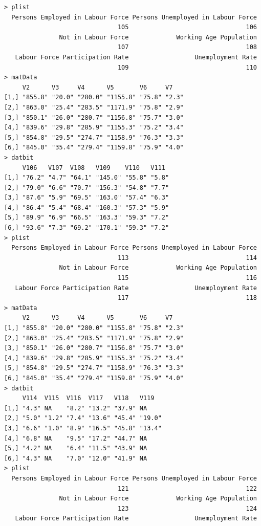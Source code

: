 \documentclass[a4paper]{article}
\begin{document}
\begin{verbatim}
> plist 
  Persons Employed in Labour Force Persons Unemployed in Labour Force 
                               105                                106 
               Not in Labour Force             Working Age Population 
                               107                                108 
   Labour Force Participation Rate                  Unemployment Rate 
                               109                                110 
> matData 
     V2      V3     V4      V5       V6     V7   
[1,] "855.8" "20.0" "280.0" "1155.8" "75.8" "2.3"
[2,] "863.0" "25.4" "283.5" "1171.9" "75.8" "2.9"
[3,] "850.1" "26.0" "280.7" "1156.8" "75.7" "3.0"
[4,] "839.6" "29.8" "285.9" "1155.3" "75.2" "3.4"
[5,] "854.8" "29.5" "274.7" "1158.9" "76.3" "3.3"
[6,] "845.0" "35.4" "279.4" "1159.8" "75.9" "4.0"
> datbit 
     V106   V107  V108   V109    V110   V111 
[1,] "76.2" "4.7" "64.1" "145.0" "55.8" "5.8"
[2,] "79.0" "6.6" "70.7" "156.3" "54.8" "7.7"
[3,] "87.6" "5.9" "69.5" "163.0" "57.4" "6.3"
[4,] "86.4" "5.4" "68.4" "160.3" "57.3" "5.9"
[5,] "89.9" "6.9" "66.5" "163.3" "59.3" "7.2"
[6,] "93.6" "7.3" "69.2" "170.1" "59.3" "7.2"
> plist 
  Persons Employed in Labour Force Persons Unemployed in Labour Force 
                               113                                114 
               Not in Labour Force             Working Age Population 
                               115                                116 
   Labour Force Participation Rate                  Unemployment Rate 
                               117                                118 
> matData 
     V2      V3     V4      V5       V6     V7   
[1,] "855.8" "20.0" "280.0" "1155.8" "75.8" "2.3"
[2,] "863.0" "25.4" "283.5" "1171.9" "75.8" "2.9"
[3,] "850.1" "26.0" "280.7" "1156.8" "75.7" "3.0"
[4,] "839.6" "29.8" "285.9" "1155.3" "75.2" "3.4"
[5,] "854.8" "29.5" "274.7" "1158.9" "76.3" "3.3"
[6,] "845.0" "35.4" "279.4" "1159.8" "75.9" "4.0"
> datbit 
     V114  V115  V116  V117   V118   V119  
[1,] "4.3" NA    "8.2" "13.2" "37.9" NA    
[2,] "5.0" "1.2" "7.4" "13.6" "45.4" "19.0"
[3,] "6.6" "1.0" "8.9" "16.5" "45.8" "13.4"
[4,] "6.8" NA    "9.5" "17.2" "44.7" NA    
[5,] "4.2" NA    "6.4" "11.5" "43.9" NA    
[6,] "4.3" NA    "7.0" "12.0" "41.9" NA    
> plist 
  Persons Employed in Labour Force Persons Unemployed in Labour Force 
                               121                                122 
               Not in Labour Force             Working Age Population 
                               123                                124 
   Labour Force Participation Rate                  Unemployment Rate 

\end{verbatim}
\end{document}
